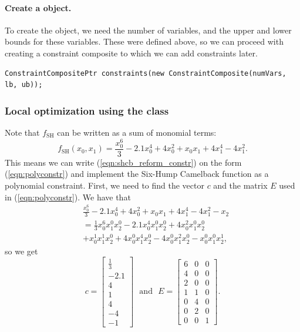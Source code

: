 \paragraph{Create a  object.} To create the  object, we need the number of variables, and the upper and lower bounds for these variables. These were defined above, so we can proceed with creating a constraint composite to which we can add constraints later.
\begin{lstlisting}
ConstraintCompositePtr constraints(new ConstraintComposite(numVars, lb, ub));
\end{lstlisting}
\subsubsection{Local optimization using the  class} \label{sec:shcb_polynomial}
Note that $f_{\mathrm{SH}}$ can be written as a sum of monomial terms:
\[
f_{\mathrm{SH}}(x_0, x_1) = \frac{x_0^6}{3} - 2.1 x_0^4 + 4x_0^2 + x_0 x_1 + 4x_1^4-4x_1^2.
\]
This means we can write (\ref{eqn:shcb_reform_constr}) on the form (\ref{eqn:polyconstr}) and implement the Six-Hump Camelback function as a polynomial constraint. First, we need to find the vector $c$ and the matrix $E$ used in (\ref{eqn:polyconstr}). We have that
\begin{align*}
&\frac{x_0^6}{3} - 2.1 x_0^4 + 4x_0^2 + x_0 x_1 + 4x_1^4-4x_1^2 - x_2 \\
&= \frac{1}{3}x_0^6 x_1^0 x_2^0 -2.1 x_0^4 x_1^0 x_2^0 + 4x_0^2 x_1^0 x_2^0 \\
&+ x_0^1 x_1^1 x_2^0 + 4x_0^0 x_1^4 x_2^0 - 4x_0^0  x_1^2 x_2^0 - x_0^0 x_1^0 x_2^1,
\end{align*}
so we get
\begin{equation}
c = \begin{bmatrix} \frac{1}{3} \\ -2.1 \\ 4 \\ 1 \\ 4 \\ -4 \\ -1 \end{bmatrix}\ \ \ \mathrm{and}\ \ \ E = \begin{bmatrix} 6 & 0 & 0 \\ 4 & 0 & 0 \\ 2 & 0 & 0 \\ 1 & 1 & 0 \\ 0 & 4 & 0 \\ 0 & 2 & 0 \\ 0 & 0 & 1 \end{bmatrix}.
\label{eqn:candE}
\end{equation}
